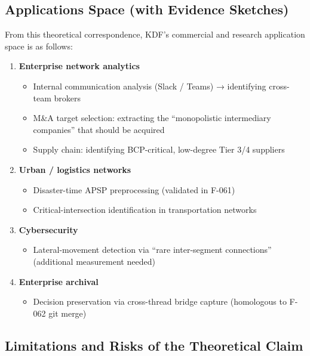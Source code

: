 \subsection{Applications Space (with Evidence Sketches)}\label{applications-space-with-evidence-sketches}

From this theoretical correspondence, KDF's commercial and research application space is as follows:

\begin{enumerate}
\def\labelenumi{\arabic{enumi}.}
\tightlist
\item
  \textbf{Enterprise network analytics}

  \begin{itemize}
  \tightlist
  \item
    Internal communication analysis (Slack / Teams) → identifying cross-team brokers
  \item
    M\&A target selection: extracting the ``monopolistic intermediary companies'' that should be acquired
  \item
    Supply chain: identifying BCP-critical, low-degree Tier 3/4 suppliers
  \end{itemize}
\item
  \textbf{Urban / logistics networks}

  \begin{itemize}
  \tightlist
  \item
    Disaster-time APSP preprocessing (validated in F-061)
  \item
    Critical-intersection identification in transportation networks
  \end{itemize}
\item
  \textbf{Cybersecurity}

  \begin{itemize}
  \tightlist
  \item
    Lateral-movement detection via ``rare inter-segment connections'' (additional measurement needed)
  \end{itemize}
\item
  \textbf{Enterprise archival}

  \begin{itemize}
  \tightlist
  \item
    Decision preservation via cross-thread bridge capture (homologous to F-062 git merge)
  \end{itemize}
\end{enumerate}

\subsection{Limitations and Risks of the Theoretical Claim}\label{limitations-and-risks-of-the-theoretical-claim}

